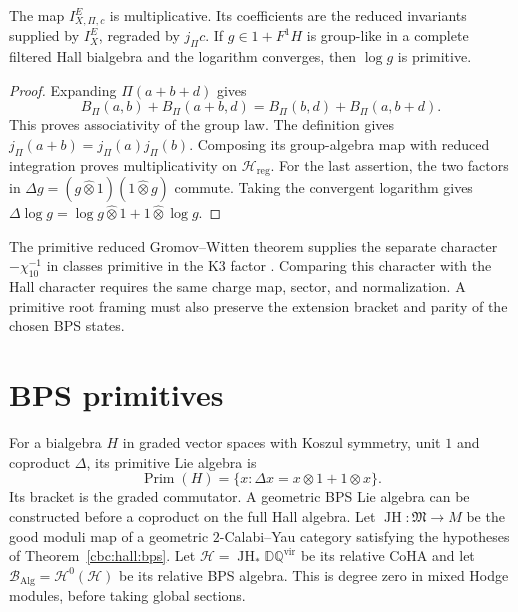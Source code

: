 \begin{proposition}\label{cyiv:polarized-character}
The map $I_{X,\Pi,c}^E$ is multiplicative.
Its coefficients are the reduced invariants supplied by $I_X^E$,
regraded by $j_\Pi c$.
If $g\in1+F^1H$ is group-like in a complete filtered Hall bialgebra
and the logarithm converges, then $\log g$ is primitive.
\end{proposition}
\begin{proof}
Expanding $\Pi(a+b+d)$ gives
\[
 B_\Pi(a,b)+B_\Pi(a+b,d)=B_\Pi(b,d)+B_\Pi(a,b+d).
\]
This proves associativity of the group law.
The definition gives $j_\Pi(a+b)=j_\Pi(a)j_\Pi(b)$.
Composing its group-algebra map with reduced integration proves
multiplicativity on $\mathcal H_{\mathrm{reg}}$.
For the last assertion, the two factors in
$\Delta g=(g\widehat\otimes1)(1\widehat\otimes g)$ commute.
Taking the convergent logarithm gives
$\Delta\log g=\log g\widehat\otimes1+1\widehat\otimes\log g$.
\end{proof}

The primitive reduced Gromov--Witten theorem supplies the separate
character $-\chi_{10}^{-1}$ in classes primitive in the K3 factor
\cite{OP}.
Comparing this character with the Hall character requires the same
charge map, sector, and normalization.
A primitive root framing must also preserve the extension bracket
and parity of the chosen BPS states.

\chapter{BPS primitives}
For a bialgebra $H$ in graded vector spaces with Koszul symmetry, unit $1$ and coproduct $\Delta$, its primitive Lie algebra is
\[
 \operatorname{Prim}(H)=\{x:\Delta x=x\otimes1+1\otimes x\}.
\]
Its bracket is the graded commutator.
A geometric BPS Lie algebra can be constructed before a coproduct on the full Hall algebra.
Let $\operatorname{JH}:\mathfrak M\to M$ be the good moduli map of a geometric $2$-Calabi--Yau category satisfying the hypotheses of Theorem~\ref{cbc:hall:bps}.
Let $\mathscr H=\operatorname{JH}_*\mathbb D\mathbb Q^{\mathrm{vir}}$ be its relative CoHA and let $\mathscr B_{\mathrm{Alg}}=\mathcal H^0(\mathscr H)$ be its relative BPS algebra.
This is degree zero in mixed Hodge modules, before taking global sections.

